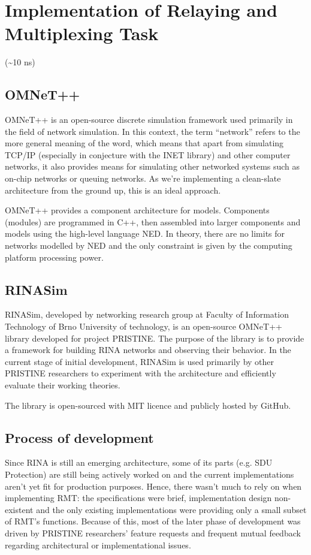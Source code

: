 \chapter{Implementation of Relaying and Multiplexing Task}
    (\textasciitilde10 ns)
    \section{OMNeT++}
        OMNeT++ is an open-source discrete simulation framework used primarily in the field of network simulation. In this context, the term ``network'' refers to the more general meaning of the word, which means that apart from simulating TCP/IP (especially in conjecture with the INET library) and other computer networks, it also provides means for simulating other networked systems such as on-chip networks or queuing networks. As we're implementing a clean-slate architecture from the ground up, this is an ideal approach.

        OMNeT++ provides a component architecture for models. Components (modules) are programmed in C++, then assembled into larger components and models using the high-level language NED. In theory, there are no limits for networks modelled by NED and the only constraint is given by the computing platform processing power.

    \section{RINASim}
        RINASim, developed by networking research group at Faculty of Information Technology of Brno University of technology, is an open-source OMNeT++ library developed for project PRISTINE. The purpose of the library is to provide a framework for building RINA networks and observing their behavior. In the current stage of initial development, RINASim is used primarily by other PRISTINE researchers to experiment with the architecture and efficiently evaluate their working theories.

        The library is open-sourced with MIT licence and publicly hosted by GitHub.

    \section{Process of development}
        Since RINA is still an emerging architecture, some of its parts (e.g. SDU Protection) are still being actively worked on and the current implementations aren't yet fit for production purposes. Hence, there wasn't much to rely on when implementing RMT: the specifications were brief, implementation design non-existent and the only existing implementations were providing only a small subset of RMT's functions. Because of this, most of the later phase of development was driven by PRISTINE researchers' feature requests and frequent mutual feedback regarding architectural or implementational issues.

